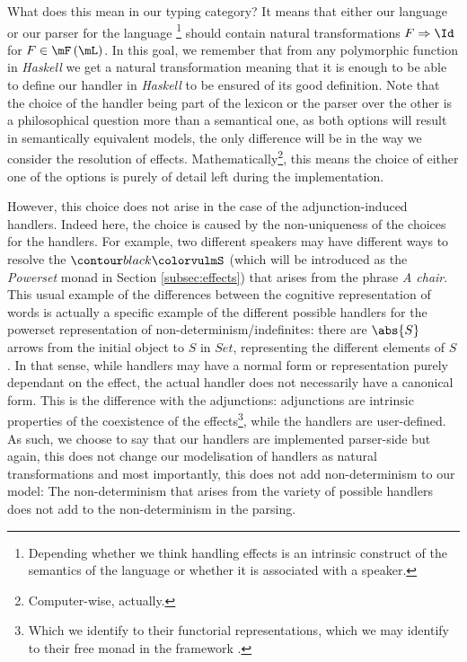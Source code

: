 \medskip

What does this mean in our typing category?
It means that either our language or our parser for the language
\footnote{Depending whether we think handling effects is an intrinsic construct
	of the semantics of the language or whether it is associated with a speaker.}
should contain natural transformations $F \Rightarrow \Id$ for
$F \in \mF\left( \mL \right)$.
In this goal, we remember that from any polymorphic function in \emph{Haskell}
we get a natural transformation \cite{wadlerTheoremsFree1989} meaning that it
is enough to be able to define our handler in \emph{Haskell} to be ensured of
its good definition.
Note that the choice of the handler being part of the lexicon or the parser
over the other is a philosophical question more than a semantical one, as both
options will result in semantically equivalent models, the only difference will
be in the way we consider the resolution of effects.
Mathematically\footnote{Computer-wise, actually.}, this means the choice of
either one of the options is purely of detail left during the implementation.

However, this choice does not arise in the case of the adjunction-induced
handlers.
Indeed here, the choice is caused by the non-uniqueness of the choices for
the handlers.
For example, two different speakers may have different ways to resolve the
$\f{S}$ (which will be introduced as the \emph{Powerset} monad in Section
\ref{subsec:effects}) that arises from the phrase \textsl{A chair}.
This usual example of the differences between the cognitive representation of
words is actually a specific example of the different possible handlers for the
powerset representation of non-determinism/indefinites:
there are $\abs{S}$ arrows from the initial object to $S$ in $\mathit{Set}$,
representing the different elements of $S$.
In that sense, while handlers may have a normal form or representation purely
dependant on the effect, the actual handler does not necessarily have
a canonical form.
This is the difference with the adjunctions: adjunctions are intrinsic
properties of the coexistence of the effects\footnote{Which we identify to
	their functorial representations, which we may identify to their free monad in
	the framework \cite{vandenbergFrameworkHigherorderEffects2024}.}, while the
handlers are user-defined.
As such, we choose to say that our handlers are implemented parser-side but
again, this does not change our modelisation of handlers as natural
transformations and most importantly, this does not add non-determinism to our
model: The non-determinism that arises from the variety of possible handlers
does not add to the non-determinism in the parsing.

